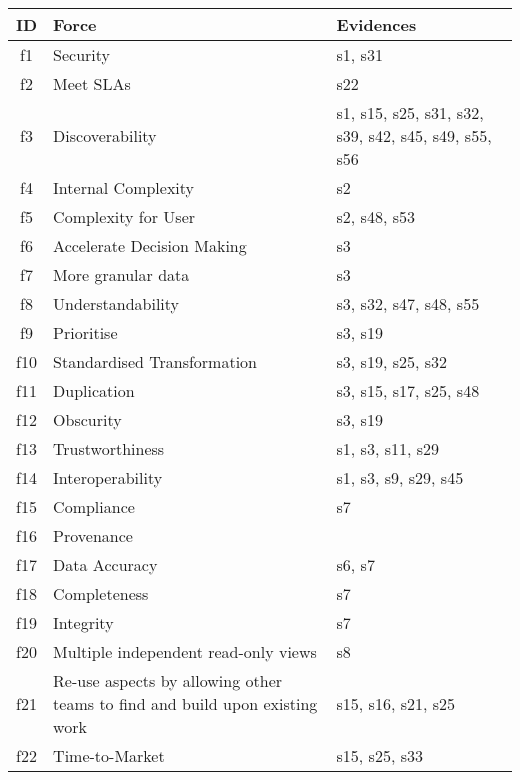 \begin{tabular}{|c|p{}|p{}|}
\hline
{\bf ID} & {\bf Force} & {\bf Evidences}\\
\hline
f1 & Security & \cellcolor{emerald_shape_1} {s1, s31}\\
f2 & Meet SLAs & \cellcolor{emerald_shape_1} {s22}\\
f3 & Discoverability & \cellcolor{emerald_shape_3} {s1, s15, s25, s31, s32, s39, s42, s45, s49, s55, s56}\\
f4 & Internal Complexity & \cellcolor{emerald_shape_1} {s2}\\
f5 & Complexity for User & \cellcolor{emerald_shape_1} {s2, s48, s53}\\
f6 & Accelerate Decision Making & \cellcolor{emerald_shape_1} {s3}\\
f7 & More granular data & \cellcolor{emerald_shape_1} {s3}\\
f8 & Understandability & \cellcolor{emerald_shape_2} {s3, s32, s47, s48, s55}\\
f9 & Prioritise & \cellcolor{emerald_shape_1} {s3, s19}\\
f10 & Standardised Transformation & \cellcolor{emerald_shape_2} {s3, s19, s25, s32}\\
f11 & Duplication & \cellcolor{emerald_shape_2} {s3, s15, s17, s25, s48}\\
f12 & Obscurity & \cellcolor{emerald_shape_1} {s3, s19}\\
f13 & Trustworthiness & \cellcolor{emerald_shape_2} {s1, s3, s11, s29}\\
f14 & Interoperability & \cellcolor{emerald_shape_2} {s1, s3, s9, s29, s45}\\
f15 & Compliance & \cellcolor{emerald_shape_1} {s7}\\
f16 & Provenance & \cellcolor{emerald_shape_1} {}\\
f17 & Data Accuracy & \cellcolor{emerald_shape_1} {s6, s7}\\
f18 & Completeness & \cellcolor{emerald_shape_1} {s7}\\
f19 & Integrity & \cellcolor{emerald_shape_1} {s7}\\
f20 & Multiple independent read-only views & \cellcolor{emerald_shape_1} {s8}\\
f21 & Re-use aspects by allowing other teams to find and build upon existing work & \cellcolor{emerald_shape_2} {s15, s16, s21, s25}\\
f22 & Time-to-Market & \cellcolor{emerald_shape_1} {s15, s25, s33}\\

\end{tabular}
